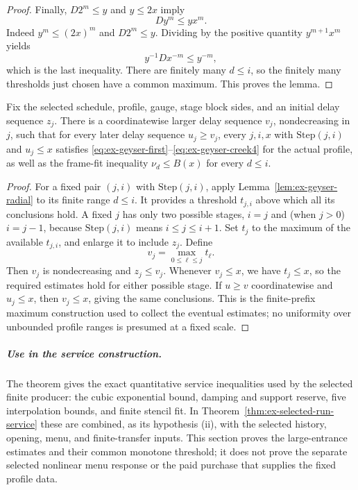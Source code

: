 \begin{proof}
Finally, $D2^m\leq y$ and $y\leq2x$ imply
\[
 D y^m\leq yx^m.
\]
Indeed $y^m\leq(2x)^m$ and $D2^m\leq y$. Dividing by the positive quantity $y^{m+1}x^m$ yields
\[
 y^{-1}D x^{-m}\leq y^{-m},
\]
which is the last inequality. There are finitely many $d\leq i$, so the finitely many thresholds just chosen have a common maximum. This proves the lemma.
\end{proof}

\begin{theorem}
\label{thm:ex-selected-geyser-steam}
Fix the selected schedule, profile, gauge, stage block sides, and an initial delay sequence $z_j$. There is a coordinatewise larger delay sequence $v_j$, nondecreasing in $j$, such that for every later delay sequence $u_j\geq v_j$, every $j,i,x$ with $\mathrm{Step}(j,i)$ and $u_j\leq x$ satisfies \eqref{eq:ex-geyser-first}--\eqref{eq:ex-geyser-creek4} for the actual profile, as well as the frame-fit inequality $\nu_d\leq B(x)$ for every $d\leq i$.
\end{theorem}

\begin{proof}
For a fixed pair $(j,i)$ with $\mathrm{Step}(j,i)$, apply Lemma~\ref{lem:ex-geyser-radial} to its finite range $d\leq i$. It provides a threshold $t_{j,i}$ above which all its conclusions hold. A fixed $j$ has only two possible stages, $i=j$ and (when $j>0$) $i=j-1$, because $\mathrm{Step}(j,i)$ means $i\leq j\leq i+1$. Set $t_j$ to the maximum of the available $t_{j,i}$, and enlarge it to include $z_j$. Define
\[
 v_j=\max_{0\leq \ell\leq j}t_\ell.
\]
Then $v_j$ is nondecreasing and $z_j\leq v_j$. Whenever $v_j\leq x$, we have $t_j\leq x$, so the required estimates hold for either possible stage. If $u\geq v$ coordinatewise and $u_j\leq x$, then $v_j\leq x$, giving the same conclusions. This is the finite-prefix maximum construction used to collect the eventual estimates; no uniformity over unbounded profile ranges is presumed at a fixed scale.
\end{proof}

\subparagraph{Use in the service construction.} The theorem gives the exact quantitative service inequalities used by the selected finite producer: the cubic exponential bound, damping and support reserve, five interpolation bounds, and finite stencil fit. In Theorem~\ref{thm:ex-selected-run-service} these are combined, as its hypothesis (ii), with the selected history, opening, menu, and finite-transfer inputs. This section proves the large-entrance estimates and their common monotone threshold; it does not prove the separate selected nonlinear menu response or the paid purchase that supplies the fixed profile data.

